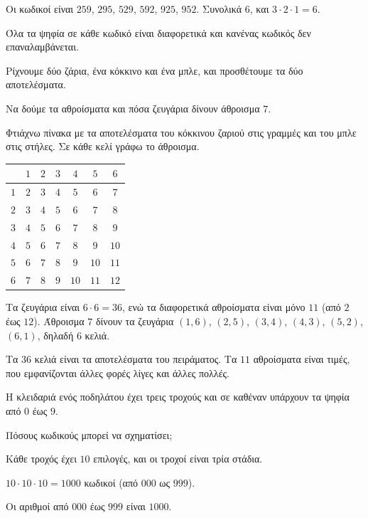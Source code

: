 \apantisi Οι κωδικοί είναι $259$, $295$, $529$, $592$, $925$, $952$. Συνολικά $6$, και $3\cdot2\cdot1=6$.\par
\elegxos Όλα τα ψηφία σε κάθε κωδικό είναι διαφορετικά και κανένας κωδικός δεν επαναλαμβάνεται.

\tixero Ρίχνουμε δύο ζάρια, ένα κόκκινο και ένα μπλε, και προσθέτουμε τα δύο αποτελέσματα.\par
\tithelo Να δούμε τα αθροίσματα και πόσα ζευγάρια δίνουν άθροισμα $7$.\par
\possindeo Φτιάχνω πίνακα με τα αποτελέσματα του κόκκινου ζαριού στις γραμμές και του μπλε στις στήλες. Σε κάθε κελί γράφω το άθροισμα.\par

\begin{center}
\renewcommand{\arraystretch}{1.15}
\begin{tabular}{c|cccccc}
 & $1$ & $2$ & $3$ & $4$ & $5$ & $6$\\\hline
$1$ & $2$ & $3$ & $4$ & $5$ & $6$ & $7$\\
$2$ & $3$ & $4$ & $5$ & $6$ & $7$ & $8$\\
$3$ & $4$ & $5$ & $6$ & $7$ & $8$ & $9$\\
$4$ & $5$ & $6$ & $7$ & $8$ & $9$ & $10$\\
$5$ & $6$ & $7$ & $8$ & $9$ & $10$ & $11$\\
$6$ & $7$ & $8$ & $9$ & $10$ & $11$ & $12$\\
\end{tabular}
\end{center}

\apantisi Τα ζευγάρια είναι $6\cdot6=36$, ενώ τα διαφορετικά αθροίσματα είναι μόνο $11$ (από $2$ έως $12$). Άθροισμα $7$ δίνουν τα ζευγάρια $(1,6)$, $(2,5)$, $(3,4)$, $(4,3)$, $(5,2)$, $(6,1)$, δηλαδή $6$ κελιά.\par
\elegxos Τα $36$ κελιά είναι τα αποτελέσματα του πειράματος. Τα $11$ αθροίσματα είναι τιμές, που εμφανίζονται άλλες φορές λίγες και άλλες πολλές.

\tixero Η κλειδαριά ενός ποδηλάτου έχει τρεις τροχούς και σε καθέναν υπάρχουν τα ψηφία από $0$ έως $9$.\par
\tithelo Πόσους κωδικούς μπορεί να σχηματίσει;\par
\possindeo Κάθε τροχός έχει $10$ επιλογές, και οι τροχοί είναι τρία στάδια.\par
\apantisi $10\cdot10\cdot10=1000$ κωδικοί (από $000$ ως $999$).\par
\elegxos Οι αριθμοί από $000$ έως $999$ είναι $1000$.

